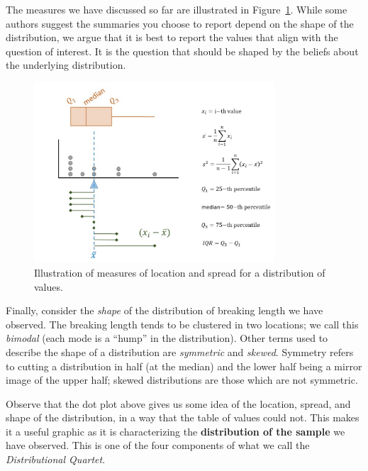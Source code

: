 \documentclass[
  letterpaper,
  DIV=11,
  numbers=noendperiod]{scrreprt}
\theoremstyle{definition}
\theoremstyle{plain}
\theoremstyle{definition}
\theoremstyle{remark}
\begin{document}
The measures we have discussed so far are illustrated in
Figure~\ref{fig-summaries-summaries}. While some authors suggest the
summaries you choose to report depend on the shape of the distribution,
we argue that it is best to report the values that align with the
question of interest. It is the question that should be shaped by the
beliefs about the underlying distribution.

\begin{figure}

{\centering \includegraphics[width=0.8\textwidth,height=\textheight]{./images/Summaries-Summaries.jpg}

}

\caption{\label{fig-summaries-summaries}Illustration of measures of
location and spread for a distribution of values.}

\end{figure}

Finally, consider the \emph{shape} of the distribution of breaking
length we have observed. The breaking length tends to be clustered in
two locations; we call this \emph{bimodal} (each mode is a ``hump'' in
the distribution). Other terms used to describe the shape of a
distribution are \emph{symmetric} and \emph{skewed}. Symmetry refers to
cutting a distribution in half (at the median) and the lower half being
a mirror image of the upper half; skewed distributions are those which
are not symmetric.

Observe that the dot plot above gives us some idea of the location,
spread, and shape of the distribution, in a way that the table of values
could not. This makes it a useful graphic as it is characterizing the
\textbf{distribution of the sample} we have observed. This is one of the
four components of what we call the \emph{Distributional Quartet}.
\end{document}
